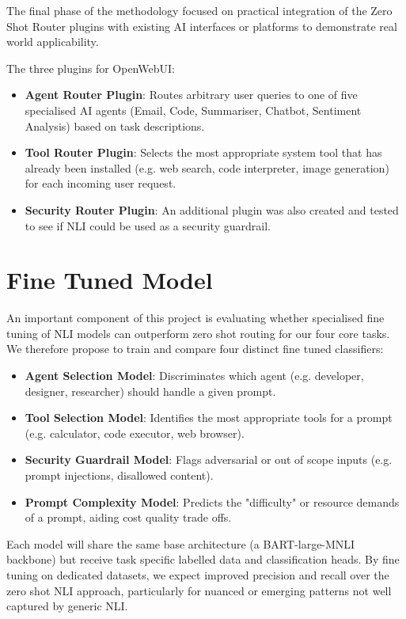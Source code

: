 The final phase of the methodology focused on practical integration of the Zero Shot Router plugins with existing AI interfaces or platforms to demonstrate real world applicability.

The three plugins for OpenWebUI:

\begin{itemize}
    \item \textbf{Agent Router Plugin}: Routes arbitrary user queries to one of five specialised AI agents (Email, Code, Summariser, Chatbot, Sentiment Analysis) based on task descriptions.
    \item \textbf{Tool Router Plugin}: Selects the most appropriate system tool that has already been installed (e.g. web search, code interpreter, image generation) for each incoming user request.
    \item \textbf{Security Router Plugin}: An additional plugin was also created and tested to see if NLI could be used as a security guardrail.
\end{itemize}


\section{Fine Tuned Model}
\label{fine tuned model}
An important component of this project is evaluating whether specialised fine tuning of NLI models can outperform zero shot routing for our four core tasks. We therefore propose to train and compare four distinct fine tuned classifiers:

\begin{itemize}
    \item \textbf{Agent Selection Model}: Discriminates which agent (e.g. developer, designer, researcher) should handle a given prompt.
    \item \textbf{Tool Selection Model}: Identifies the most appropriate tools for a prompt (e.g. calculator, code executor, web browser).
    \item \textbf{Security Guardrail Model}: Flags adversarial or out of scope inputs (e.g. prompt injections, disallowed content).
    \item \textbf{Prompt Complexity Model}: Predicts the "difficulty" or resource demands of a prompt, aiding cost quality trade offs.
\end{itemize}

Each model will share the same base architecture (a BART-large-MNLI backbone) but receive task specific labelled data and classification heads. By fine tuning on dedicated datasets, we expect improved precision and recall over the zero shot NLI approach, particularly for nuanced or emerging patterns not well captured by generic NLI.

